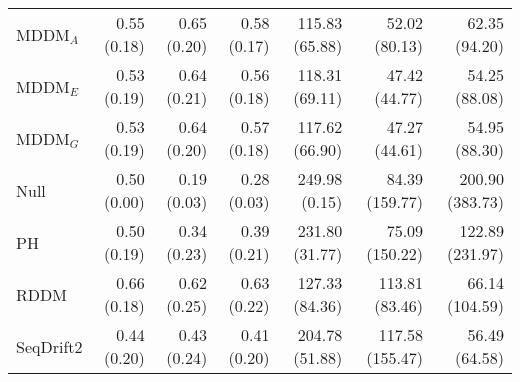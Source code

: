 \begin{tabular}{lrrrrrr}
MDDM$_A$   &       0.55 (0.18) &       0.65 (0.20) &       0.58 (0.17) &      115.83 (65.88) &       52.02 (80.13) &      62.35 (94.20) \\
MDDM$_E$   &       0.53 (0.19) &       0.64 (0.21) &       0.56 (0.18) &      118.31 (69.11) &       47.42 (44.77) &      54.25 (88.08) \\
MDDM$_G$   &       0.53 (0.19) &       0.64 (0.20) &       0.57 (0.18) &      117.62 (66.90) &       47.27 (44.61) &      54.95 (88.30) \\
Null &       0.50 (0.00) &       0.19 (0.03) &       0.28 (0.03) &       249.98 (0.15) &      84.39 (159.77) &    200.90 (383.73) \\
PH  &       0.50 (0.19) &       0.34 (0.23) &       0.39 (0.21) &      231.80 (31.77) &      75.09 (150.22) &    122.89 (231.97) \\
RDDM         &       0.66 (0.18) &       0.62 (0.25) &       0.63 (0.22) &      127.33 (84.36) &      113.81 (83.46) &     66.14 (104.59) \\
SeqDrift2    &       0.44 (0.20) &       0.43 (0.24) &       0.41 (0.20) &      204.78 (51.88) &     117.58 (155.47) &      56.49 (64.58) \\
\bottomrule
\end{tabular}
